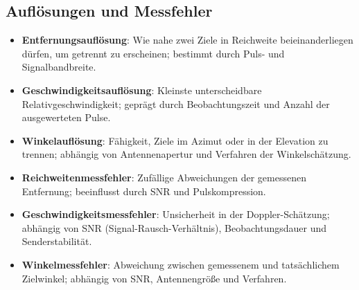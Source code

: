 \subsection{Auflösungen und Messfehler}
\begin{itemize}
  \item \textbf{Entfernungsauflösung}: Wie nahe zwei Ziele in Reichweite beieinanderliegen dürfen, um getrennt zu erscheinen;
        bestimmt durch Puls- und Signalbandbreite.
  \item \textbf{Geschwindigkeitsauflösung}: Kleinste unterscheidbare Relativgeschwindigkeit; geprägt durch Beobachtungszeit
        und Anzahl der ausgewerteten Pulse.
  \item \textbf{Winkelauflösung}: Fähigkeit, Ziele im Azimut oder in der Elevation zu trennen; abhängig von Antennenapertur und Verfahren der Winkelschätzung.
  \item \textbf{Reichweitenmessfehler}: Zufällige Abweichungen der gemessenen Entfernung; beeinflusst durch SNR und Pulskompression.
  \item \textbf{Geschwindigkeitsmessfehler}: Unsicherheit in der Doppler-Schätzung; abhängig von SNR (Signal-Rausch-Verhältnis), Beobachtungsdauer und Senderstabilität.
  \item \textbf{Winkelmessfehler}: Abweichung zwischen gemessenem und tatsächlichem Zielwinkel; abhängig von SNR, Antennengröße und Verfahren.
\end{itemize}

